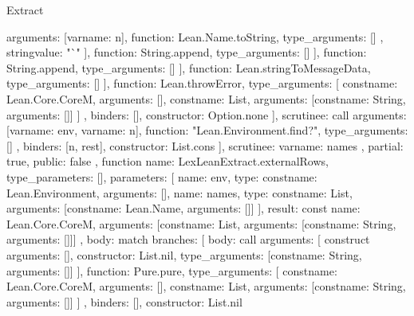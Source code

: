 \begin{lexlean}{Extract}
\begin{toolingmodule}
{{{{{{{{{{{                                    arguments: [var{name: n}],
                                    function: Lean.Name.toString,
                                    type_arguments: []
                                  },
                                  string{value: "`"}
                                ],
                                function: String.append,
                                type_arguments: []
                              }
                            ],
                            function: String.append,
                            type_arguments: []
                          }
                        ],
                        function: Lean.stringToMessageData,
                        type_arguments: []
                      }
                    ],
                    function: Lean.throwError,
                    type_arguments: [
                      const{name: Lean.Core.CoreM, arguments: []},
                      const{name: List, arguments: [const{name: String, arguments: []}]}
                    ]
                  },
                  binders: [],
                  constructor: Option.none
                }
              ],
              scrutinee: call{
                arguments: [var{name: env}, var{name: n}],
                function: "Lean.Environment.find?",
                type_arguments: []
              }
            },
            binders: [n, rest],
            constructor: List.cons
          }
        ],
        scrutinee: var{name: names}
      },
      partial: true,
      public: false
    },
    function{
      name: LexLeanExtract.externalRows,
      type_parameters: [],
      parameters: [
        {name: env, type: const{name: Lean.Environment, arguments: []}},
        {name: names, type: const{name: List, arguments: [const{name: Lean.Name, arguments: []}]}}
      ],
      result: const{
        name: Lean.Core.CoreM,
        arguments: [const{name: List, arguments: [const{name: String, arguments: []}]}]
      },
      body: match{
        branches: [
          {
            body: call{
              arguments: [
                construct{
                  arguments: [],
                  constructor: List.nil,
                  type_arguments: [const{name: String, arguments: []}]
                }
              ],
              function: Pure.pure,
              type_arguments: [
                const{name: Lean.Core.CoreM, arguments: []},
                const{name: List, arguments: [const{name: String, arguments: []}]}
              ]
            },
            binders: [],
            constructor: List.nil
}}}}
\end{toolingmodule}
\end{lexlean}
